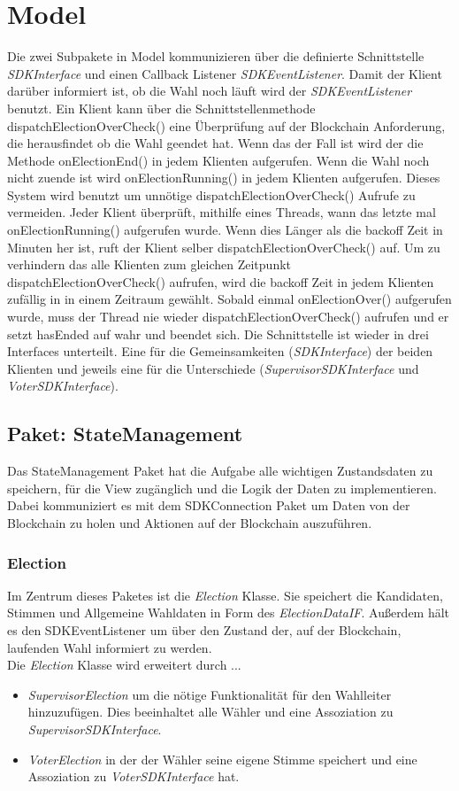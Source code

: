 \documentclass[parskip=full]{scrartcl}
\begin{document}
	\section{Model}
	Die zwei Subpakete in Model kommunizieren über die definierte Schnittstelle \textit{SDKInterface} und einen Callback Listener \textit{SDKEventListener}. 
	Damit der Klient darüber informiert ist, ob die Wahl noch läuft wird der \textit{SDKEventListener} benutzt. Ein Klient kann über die Schnittstellenmethode dispatchElectionOverCheck() eine Überprüfung auf der Blockchain Anforderung, die herausfindet ob die Wahl geendet hat. Wenn das der Fall ist wird der die Methode onElectionEnd() in jedem Klienten aufgerufen. Wenn die Wahl noch nicht zuende ist wird onElectionRunning() in jedem Klienten aufgerufen. Dieses System wird benutzt um unnötige dispatchElectionOverCheck() Aufrufe zu vermeiden. Jeder Klient überprüft, mithilfe eines Threads, wann das letzte mal onElectionRunning() aufgerufen wurde. Wenn dies Länger als die backoff Zeit in Minuten her ist, ruft der Klient selber dispatchElectionOverCheck() auf. Um zu verhindern das alle Klienten zum gleichen Zeitpunkt dispatchElectionOverCheck() aufrufen, wird die backoff Zeit in jedem Klienten zufällig in in einem Zeitraum gewählt. Sobald einmal onElectionOver() aufgerufen wurde, muss der Thread nie wieder dispatchElectionOverCheck() aufrufen und er setzt hasEnded auf wahr und beendet sich.
	Die Schnittstelle ist wieder in drei Interfaces unterteilt. Eine für die Gemeinsamkeiten (\textit{SDKInterface}) der beiden Klienten und jeweils eine für die Unterschiede (\textit{SupervisorSDKInterface} und \textit{VoterSDKInterface}).

	\subsection{Paket: StateManagement}
	Das StateManagement Paket hat die Aufgabe alle wichtigen Zustandsdaten zu speichern, für die View zugänglich und die Logik der Daten zu implementieren.
	Dabei kommuniziert es mit dem SDKConnection Paket um Daten von der Blockchain zu holen und Aktionen auf der Blockchain auszuführen.
	
		\subsubsection{Election}
		Im Zentrum dieses Paketes ist die \textit{Election} Klasse. Sie speichert die Kandidaten, Stimmen und Allgemeine Wahldaten in Form des \textit{ElectionDataIF}. Außerdem hält es den SDKEventListener um über den Zustand der, auf 
		der Blockchain, laufenden Wahl informiert zu werden.\\
		Die \textit{Election} Klasse wird erweitert durch ...
		\begin{itemize}
			\item\textit{SupervisorElection} um die nötige Funktionalität für den Wahlleiter hinzuzufügen. Dies beeinhaltet alle Wähler und eine Assoziation zu \textit{SupervisorSDKInterface}.
			\item\textit{VoterElection} in der der Wähler seine eigene Stimme speichert und eine Assoziation zu \textit{VoterSDKInterface} hat.
		\end{itemize}
		
\end{document}
